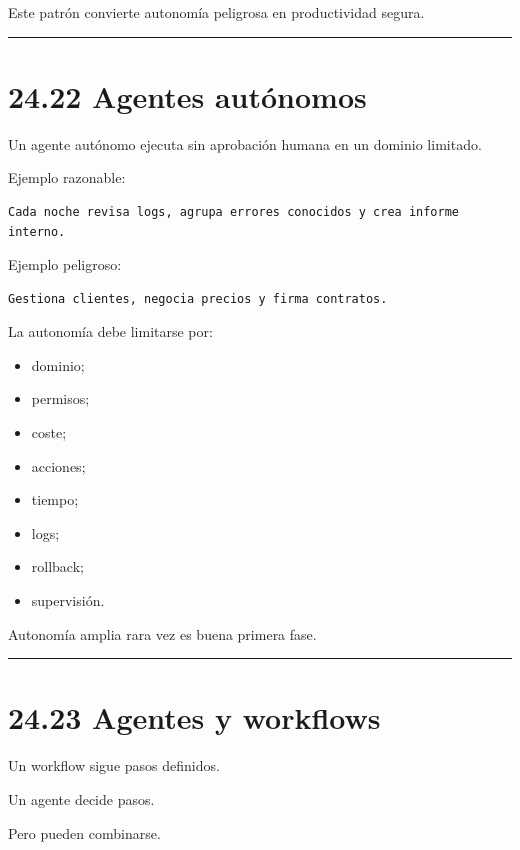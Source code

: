 Este patrón convierte autonomía peligrosa en productividad segura.

\begin{center}\rule{0.5\linewidth}{0.5pt}\end{center}

\section{24.22 Agentes autónomos}\label{agentes-autuxf3nomos}

Un agente autónomo ejecuta sin aprobación humana en un dominio limitado.

Ejemplo razonable:

\begin{lstlisting}
Cada noche revisa logs, agrupa errores conocidos y crea informe interno.
\end{lstlisting}

Ejemplo peligroso:

\begin{lstlisting}
Gestiona clientes, negocia precios y firma contratos.
\end{lstlisting}

La autonomía debe limitarse por:

\begin{itemize}
\tightlist
\item
  dominio;
\item
  permisos;
\item
  coste;
\item
  acciones;
\item
  tiempo;
\item
  logs;
\item
  rollback;
\item
  supervisión.
\end{itemize}

Autonomía amplia rara vez es buena primera fase.

\begin{center}\rule{0.5\linewidth}{0.5pt}\end{center}

\section{24.23 Agentes y workflows}\label{agentes-y-workflows}

Un workflow sigue pasos definidos.

Un agente decide pasos.

Pero pueden combinarse.


